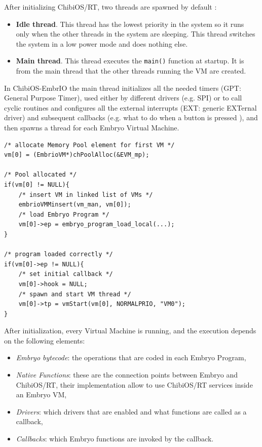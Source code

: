 \documentclass[a4paper,10pt]{article}
\begin{document}
\begin{multicols}{2}
After initializing ChibiOS/RT, two threads are spawned by default \cite{chThd}:
\begin{itemize}
\item \textbf{Idle thread}. This thread has the lowest priority in the system so it runs only when the other threads in the system are sleeping. This thread switches the system in a low power mode and does nothing else.
\item \textbf{Main thread}. This thread executes the \texttt{main()} function at startup. It is from the main thread that the other threads running the VM are created.
\end{itemize}

In ChibiOS-EmbrIO the main thread initializes all the needed timers (GPT: General Purpose Timer), used either by different drivers (e.g. SPI) or to call cyclic routines and configures all the external interrupts (EXT: generic EXTernal driver) and subsequent callbacks (e.g. what to do when a button is pressed ), and then spawns a thread for each Embryo Virtual Machine.
\bigskip
\begin{lstlisting}[caption={EmbrIO VM start}]
/* allocate Memory Pool element for first VM */
vm[0] = (EmbrioVM*)chPoolAlloc(&EVM_mp);

/* Pool allocated */
if(vm[0] != NULL){
	/* insert VM in linked list of VMs */
	embrioVMMinsert(vm_man, vm[0]);
	/* load Embryo Program */
	vm[0]->ep = embryo_program_load_local(...);
}

/* program loaded correctly */
if(vm[0]->ep != NULL){
	/* set initial callback */
	vm[0]->hook = NULL;
	/* spawn and start VM thread */
	vm[0]->tp = vmStart(vm[0], NORMALPRIO, "VM0");
}
\end{lstlisting}
\bigskip
After initialization, every Virtual Machine is running, and the execution depends on the following elements:
\begin{itemize}
\item \textit{Embryo bytecode}: the operations that are coded in each Embryo Program,
\item \textit{Native Functions}: these are the connection points between Embryo and ChibiOS/RT, their implementation allow to use ChibiOS/RT services inside an Embryo VM,
\item \textit{Drivers}: which drivers that are enabled and what functions are called as a callback,
\item \textit{Callbacks}: which Embryo functions are invoked by the callback.
\end{itemize}


\end{multicols}
\end{document}
